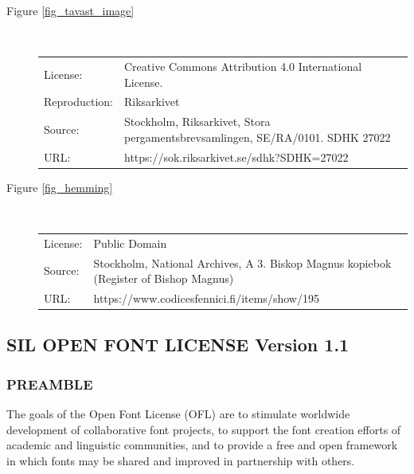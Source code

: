 \documentclass[a4paper]{article}
\begin{document}
\begin{description}
  \item [Figure \ref{fig_tavast_image}]  \mbox{} \\

\begin{tabular}{p{2cm}p{10cm}}
      
      License: &  Creative Commons Attribution 4.0 International
      License.  \\
      Reproduction: & Riksarkivet \\
      Source: &     Stockholm, Riksarkivet, Stora
      pergamentsbrevsamlingen, SE/RA/0101.  SDHK 27022 \\
      URL: & https://sok.riksarkivet.se/sdhk?SDHK=27022 \\
    \end{tabular}




  \item [Figure \ref{fig_hemming}]    \mbox{} \\

    \begin{tabular}{p{2cm}p{10cm}}
      License: & Public Domain \\
      Source: & Stockholm, National Archives, A 3. Biskop Magnus
      kopiebok (Register of Bishop Magnus) \\
      URL: & https://www.codicesfennici.fi/items/show/195 
    \end{tabular}
    
    

\end{description}
\label{image_license_end}






\subsection*{SIL OPEN FONT LICENSE Version 1.1}

\label{pg_license}

\subsubsection*{PREAMBLE}

The goals of the Open Font License (OFL) are to stimulate worldwide
development of collaborative font projects, to support the font
creation efforts of academic and linguistic communities, and to
provide a free and open framework in which fonts may be shared and
improved in partnership with others.
\end{document}
